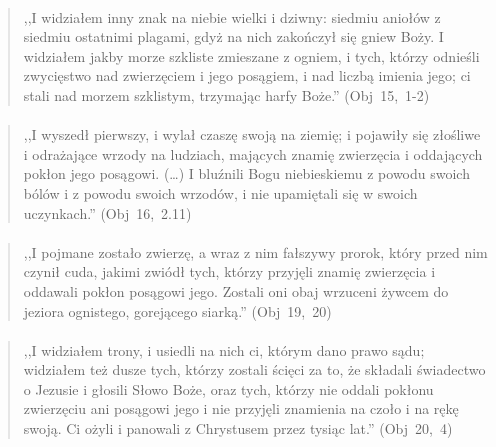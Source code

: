 \documentclass[10pt,a4paper,oneside]{article}
\begin{document}
\paragraph{}
\begin{quote}
,,I widziałem inny znak na niebie wielki i dziwny: siedmiu aniołów z siedmiu ostatnimi plagami, gdyż na nich zakończył się gniew Boży. I widziałem jakby morze szkliste zmieszane z ogniem, i tych, którzy odnieśli zwycięstwo nad zwierzęciem i jego posągiem, i nad liczbą imienia jego; ci stali nad morzem szklistym, trzymając harfy Boże.'' \mbox{(Obj 15, 1-2)}
\end{quote}
\paragraph{}
\begin{quote}
,,I wyszedł pierwszy, i wylał czaszę swoją na ziemię; i pojawiły się złośliwe i odrażające wrzody na ludziach, mających znamię zwierzęcia i oddających pokłon jego posągowi. (\ldots) I bluźnili Bogu niebieskiemu z powodu swoich bólów i z powodu swoich wrzodów, i nie upamiętali się w swoich uczynkach.'' \mbox{(Obj 16, 2.11)}
\end{quote}
\paragraph{}
\begin{quote}
,,I pojmane zostało zwierzę, a wraz z nim fałszywy prorok, który przed nim czynił cuda, jakimi zwiódł tych, którzy przyjęli znamię zwierzęcia i oddawali pokłon posągowi jego. Zostali oni obaj wrzuceni żywcem do jeziora ognistego, gorejącego siarką.'' \mbox{(Obj 19, 20)}
\end{quote}
\paragraph{}
\begin{quote}
,,I widziałem trony, i usiedli na nich ci, którym dano prawo sądu; widziałem też dusze tych, którzy zostali ścięci za to, że składali świadectwo o Jezusie i głosili Słowo Boże, oraz tych, którzy nie oddali pokłonu zwierzęciu ani posągowi jego i nie przyjęli znamienia na czoło i na rękę swoją. Ci ożyli i panowali z Chrystusem przez tysiąc lat.'' \mbox{(Obj 20, 4)}
\end{quote}
\end{document}
